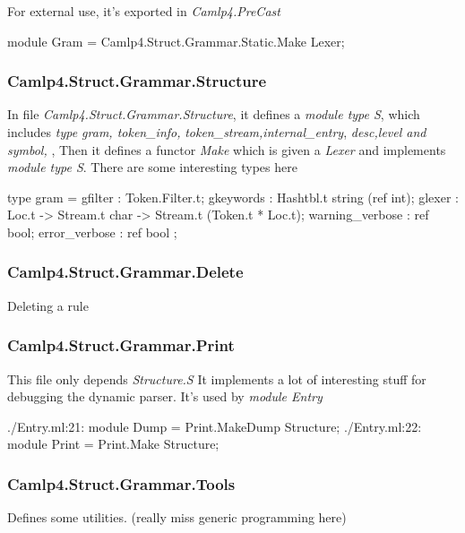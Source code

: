 For external use, it's exported in \textit{Camlp4.PreCast}

\begin{ocamlcode}
  module Gram = Camlp4.Struct.Grammar.Static.Make Lexer;
\end{ocamlcode}

\subsubsection{Camlp4.Struct.Grammar.Structure}
\label{Camlp4.Struct.Grammar.Structure}

In file \textit{Camlp4.Struct.Grammar.Structure}, it defines a
\textit{module type S}, which includes \textit{type gram,
  token\_info,} \textit{token\_stream,internal\_entry},
\textit{desc,level and symbol, }, Then it defines a functor
\textit{Make} which is given a \textit{Lexer} and implements
\textit{module type S}. There are some interesting types here

\begin{ocamlcode}
  type gram =
    { gfilter         : Token.Filter.t;
      gkeywords       : Hashtbl.t string (ref int);
      glexer          : Loc.t -> Stream.t char -> Stream.t (Token.t * Loc.t);
      warning_verbose : ref bool;
      error_verbose   : ref bool };
\end{ocamlcode}

\subsubsection{Camlp4.Struct.Grammar.Delete}
\label{Camlp4.Struct.Grammar.Delete}

Deleting a rule



\subsubsection{Camlp4.Struct.Grammar.Print}
\label{Camlp4.Struct.Grammar.Print}
This file only depends \textit{Structure.S} It implements a lot of
interesting stuff for debugging the dynamic parser. It's used by
\textit{module Entry}

\begin{ocamlcode}
./Entry.ml:21:  module Dump  = Print.MakeDump Structure;
./Entry.ml:22:  module Print = Print.Make Structure;
\end{ocamlcode}

\subsubsection{Camlp4.Struct.Grammar.Tools}
Defines some utilities. (really miss generic programming here)

